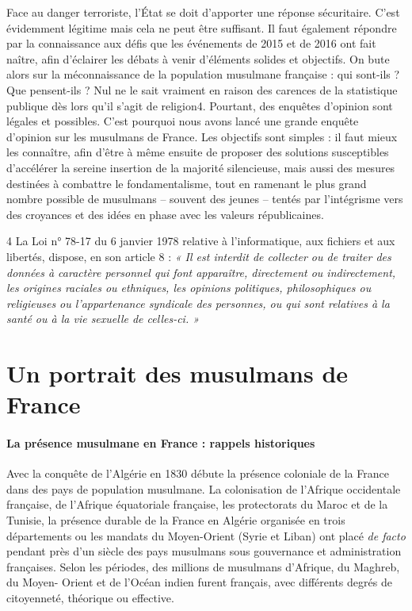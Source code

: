 Face au danger terroriste, l'État se doit d'apporter une réponse
sécuritaire. C'est évidemment légitime mais cela ne peut être suffisant.
Il faut également répondre par la connaissance aux défis que les
événements de 2015 et de 2016 ont fait naître, afin d'éclairer les
débats à venir d'éléments solides et objectifs. On bute alors sur la
méconnaissance de la population musulmane française : qui sont-ils ? Que
pensent-ils ? Nul ne le sait vraiment en raison des carences de la
statistique publique dès lors qu'il s'agit de religion4. Pourtant, des
enquêtes d'opinion sont légales et possibles. C'est pourquoi nous avons
lancé une grande enquête d'opinion sur les musulmans de France. Les
objectifs sont simples : il faut mieux les connaître, afin d'être à même
ensuite de proposer des solutions susceptibles d'accélérer la sereine
insertion de la majorité silencieuse, mais aussi des mesures destinées à
combattre le fondamentalisme, tout en ramenant le plus grand nombre
possible de musulmans -- souvent des jeunes -- tentés par l'intégrisme
vers des croyances et des idées en phase avec les valeurs républicaines.

4 La Loi n° 78-17 du 6 janvier 1978 relative à l'informatique, aux
fichiers et aux libertés, dispose, en son article 8 : \emph{« Il est
interdit de collecter ou de traiter des données à caractère personnel
qui font apparaître, directement ou indirectement, les origines raciales
ou ethniques, les opinions politiques, philosophiques ou religieuses ou
l'appartenance syndicale des personnes, ou qui sont relatives à la santé
ou à la vie sexuelle de celles-ci. »}


\section{Un portrait des musulmans de France}

\paragraph{La présence musulmane en France : rappels historiques}


Avec la conquête de l'Algérie en 1830 débute la présence coloniale de la
France dans des pays de population musulmane. La colonisation de
l'Afrique occidentale française, de l'Afrique équatoriale française, les
protectorats du Maroc et de la Tunisie, la présence durable de la France
en Algérie organisée en trois départements ou les mandats du
Moyen-Orient (Syrie et Liban) ont placé \emph{de facto} pendant près
d'un siècle des pays musulmans sous gouvernance et administration
françaises. Selon les périodes, des millions de musulmans d'Afrique, du
Maghreb, du Moyen- Orient et de l'Océan indien furent français, avec
différents degrés de citoyenneté, théorique ou effective.

